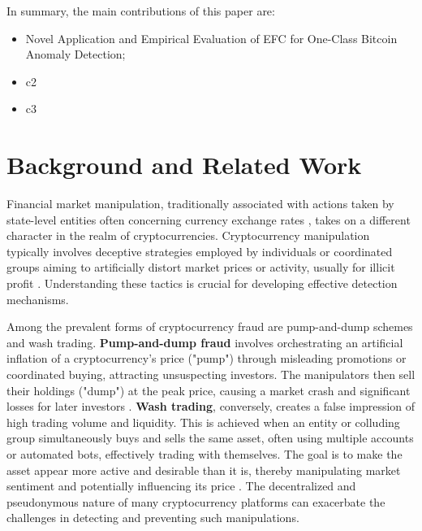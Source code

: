 \documentclass[12pt]{article}
\begin{document}
In summary, the main contributions of this paper are:

\begin{itemize}
    \item Novel Application and Empirical Evaluation of EFC for One-Class Bitcoin Anomaly Detection;
    \item c2
    \item c3
\end{itemize}

\section{Background and Related Work} \label{sec:background}

Financial market manipulation, traditionally associated with actions taken by state-level entities often concerning currency
exchange rates \cite{domanski2011currency, market_manipulation_detection_2022}, takes on a different character in the realm
of cryptocurrencies. Cryptocurrency manipulation typically involves deceptive strategies employed by individuals or coordinated
groups aiming to artificially distort market prices or activity, usually for illicit profit \cite{cryptocurrency_arket_manipulation_2021}.
Understanding these tactics is crucial for developing effective detection mechanisms.

Among the prevalent forms of cryptocurrency fraud are pump-and-dump schemes and wash trading. \textbf{Pump-and-dump fraud}
involves orchestrating an artificial inflation of a cryptocurrency's price ("pump") through misleading promotions or coordinated
buying, attracting unsuspecting investors. The manipulators then sell their holdings ("dump") at the peak price, causing
a market crash and significant losses for later investors \cite{karim2018manipulation}. \textbf{Wash trading}, conversely,
creates a false impression of high trading volume and liquidity. This is achieved when an entity or colluding group
simultaneously buys and sells the same asset, often using multiple accounts or automated bots, effectively trading with
themselves. The goal is to make the asset appear more active and desirable than it is, thereby manipulating market sentiment
and potentially influencing its price \cite{gandal2018price, edelman2018detecting}. The decentralized and pseudonymous
nature of many cryptocurrency platforms can exacerbate the challenges in detecting and preventing such manipulations.
\end{document}
